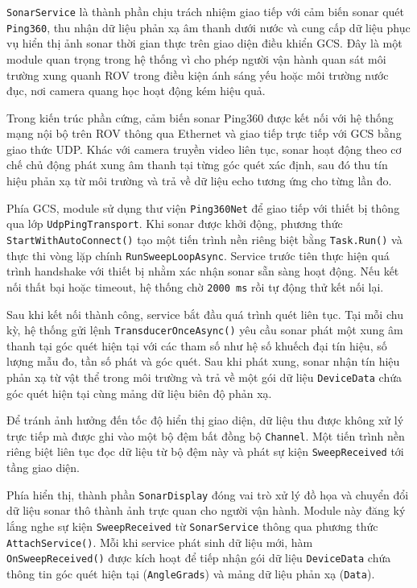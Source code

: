 \documentclass[../DoAn.tex]{subfiles}
\begin{document}
\texttt{SonarService} là thành phần chịu trách nhiệm giao tiếp với cảm biến sonar quét \texttt{Ping360}, thu nhận dữ liệu phản xạ âm thanh dưới nước và cung cấp dữ liệu phục vụ hiển thị ảnh sonar thời gian thực trên giao diện điều khiển GCS. Đây là một module quan trọng trong hệ thống vì cho phép người vận hành quan sát môi trường xung quanh ROV trong điều kiện ánh sáng yếu hoặc môi trường nước đục, nơi camera quang học hoạt động kém hiệu quả.

Trong kiến trúc phần cứng, cảm biến sonar Ping360 được kết nối với hệ thống mạng nội bộ trên ROV thông qua Ethernet và giao tiếp trực tiếp với GCS bằng giao thức UDP. Khác với camera truyền video liên tục, sonar hoạt động theo cơ chế chủ động phát xung âm thanh tại từng góc quét xác định, sau đó thu tín hiệu phản xạ từ môi trường và trả về dữ liệu echo tương ứng cho từng lần đo.

Phía GCS, module sử dụng thư viện \texttt{Ping360Net} để giao tiếp với thiết bị thông qua lớp \texttt{UdpPingTransport}. Khi sonar được khởi động, phương thức \texttt{StartWithAutoConnect()} tạo một tiến trình nền riêng biệt bằng \texttt{Task.Run()} và thực thi vòng lặp chính \texttt{RunSweepLoopAsync}. Service trước tiên thực hiện quá trình handshake với thiết bị nhằm xác nhận sonar sẵn sàng hoạt động. Nếu kết nối thất bại hoặc timeout, hệ thống chờ \texttt{2000\,ms} rồi tự động thử kết nối lại.

Sau khi kết nối thành công, service bắt đầu quá trình quét liên tục. Tại mỗi chu kỳ, hệ thống gửi lệnh \texttt{TransducerOnceAsync()} yêu cầu sonar phát một xung âm thanh tại góc quét hiện tại với các tham số như hệ số khuếch đại tín hiệu, số lượng mẫu đo, tần số phát và góc quét. Sau khi phát xung, sonar nhận tín hiệu phản xạ từ vật thể trong môi trường và trả về một gói dữ liệu \texttt{DeviceData} chứa góc quét hiện tại cùng mảng dữ liệu biên độ phản xạ.

Để tránh ảnh hưởng đến tốc độ hiển thị giao diện, dữ liệu thu được không xử lý trực tiếp mà được ghi vào một bộ đệm bất đồng bộ \texttt{Channel}. Một tiến trình nền riêng biệt liên tục đọc dữ liệu từ bộ đệm này và phát sự kiện \texttt{SweepReceived} tới tầng giao diện.

Phía hiển thị, thành phần \texttt{SonarDisplay} đóng vai trò xử lý đồ họa và chuyển đổi dữ liệu sonar thô thành ảnh trực quan cho người vận hành. Module này đăng ký lắng nghe sự kiện \texttt{SweepReceived} từ \texttt{SonarService} thông qua phương thức \texttt{AttachService()}. Mỗi khi service phát sinh dữ liệu mới, hàm \texttt{OnSweepReceived()} được kích hoạt để tiếp nhận gói dữ liệu \texttt{DeviceData} chứa thông tin góc quét hiện tại (\texttt{AngleGrads}) và mảng dữ liệu phản xạ (\texttt{Data}).
\end{document}
